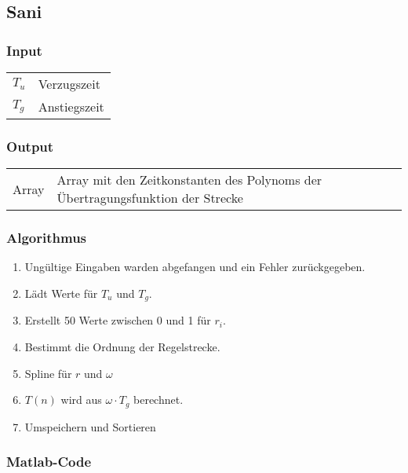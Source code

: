 \subsection{Sani}

\subsubsection*{Input}

\begin{tabular}{p{40mm}l}
    $ T_u $ & Verzugszeit \\
    $ T_g $ & Anstiegszeit
\end{tabular}

\subsubsection*{Output}
\begin{tabular}{p{40mm}l}
    Array & \parbox[t][4em][s]{0.7\textwidth}{Array mit den Zeitkonstanten des Polynoms der \"Ubertragungsfunktion der Strecke}
\end{tabular}

\subsubsection*{Algorithmus}
\begin{enumerate}
    \item
        Ung\"ultige Eingaben warden abgefangen und ein Fehler zur\"uckgegeben.
    \item
        L\"adt Werte f\"ur $T_u$ und $T_g$.
    \item
        Erstellt 50 Werte zwischen 0 und 1 f\"ur $r_i$.
    \item
        Bestimmt die Ordnung der Regelstrecke.
    \item
        Spline f\"ur $r$ und $\omega$ 
    \item
        $T(n)$ wird aus $\omega \cdot T_g$ berechnet.
    \item
        Umspeichern und Sortieren
\end{enumerate}

\subsubsection*{Matlab-Code}




